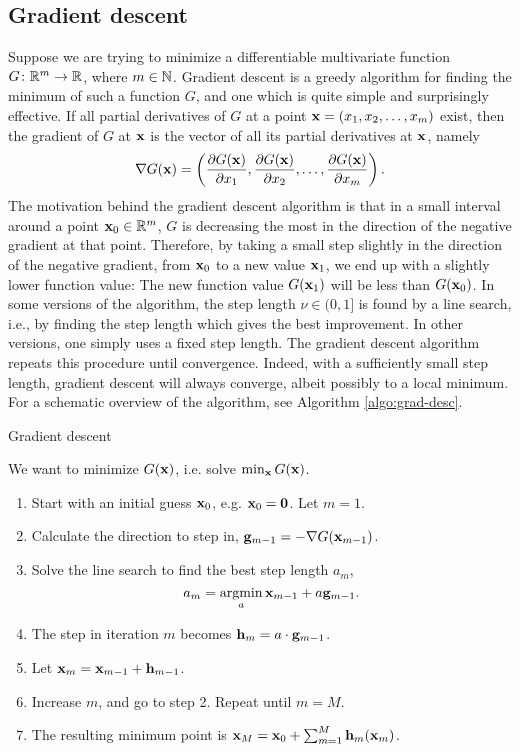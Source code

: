 \subsection{Gradient descent}
Suppose we are trying to minimize a differentiable multivariate function $G\colon\mathbb{R}^m\to\mathbb{R}$, where $m\in\mathbb{N}$. Gradient descent is a greedy algorithm for finding the minimum of such a function $G$, and one which is quite simple and surprisingly effective. If all partial derivatives of $G$ at a point $\mathbf{x}=(x_1,x_2,\ldots,x_m)$ exist, then the gradient of $G$ at $\mathbf{x}$ is the vector of all its partial derivatives at $\mathbf{x}$, namely
\begin{equation}
    \nabla G(\mathbf{x})=\left(\frac{\partial G(\mathbf{x})}{\partial x_1},\frac{\partial G(\mathbf{x})}{\partial x_2},\ldots,\frac{\partial G(\mathbf{x})}{\partial x_m}\right).
\end{equation}
The motivation behind the gradient descent algorithm is that in a small interval around a point $\mathbf{x}_0\in\mathbb{R}^m$, $G$ is decreasing the most in the direction of the negative gradient at that point. Therefore, by taking a small step slightly in the direction of the negative gradient, from $\mathbf{x}_0$ to a new value $\mathbf{x}_1$, we end up with a slightly lower function value: The new function value $G(\mathbf{x}_1)$ will be less than $G(\mathbf{x}_0)$. In some versions of the algorithm, the step length $\nu\in(0,1]$ is found by a line search, i.e., by finding the step length which gives the best improvement. In other versions, one simply uses a fixed step length. The gradient descent algorithm repeats this procedure until convergence. Indeed, with a sufficiently small step length, gradient descent will always converge, albeit possibly to a local minimum. For a schematic overview of the algorithm, see Algorithm \ref{algo:grad-desc}.
\begin{algorithm}
\caption{Gradient descent}
\label{algo:grad-desc}
We want to minimize $G(\mathbf{x})$, i.e. solve $\min_{\mathbf{x}}G(\mathbf{x})$.
\begin{enumerate}
    \item Start with an initial guess $\mathbf{x}_0$, e.g. $\mathbf{x}_0=\mathbf{0}$. Let $m=1$.
    \item Calculate the direction to step in, $\mathbf{g}_{m-1}=-\nabla G(\mathbf{x}_{m-1})$.
    \item Solve the line search to find the best step length $a_m$,
        \begin{equation*}
            a_m=\operatorname*{argmin}_{a}\mathbf{x}_{m-1}+a \mathbf{g}_{m-1}.
        \end{equation*}
    \item The step in iteration $m$ becomes $\mathbf{h}_m=a\cdot\mathbf{g}_{m-1}$.
    \item Let $\mathbf{x}_m=\mathbf{x}_{m-1}+\mathbf{h}_{m-1}$.
    \item Increase $m$, and go to step 2. Repeat until $m=M$.
    \item The resulting minimum point is $\mathbf{x}_M=\mathbf{x}_0+\sum_{m=1}^M\mathbf{h}_m(\mathbf{x}_m)$.
\end{enumerate}
\end{algorithm}
